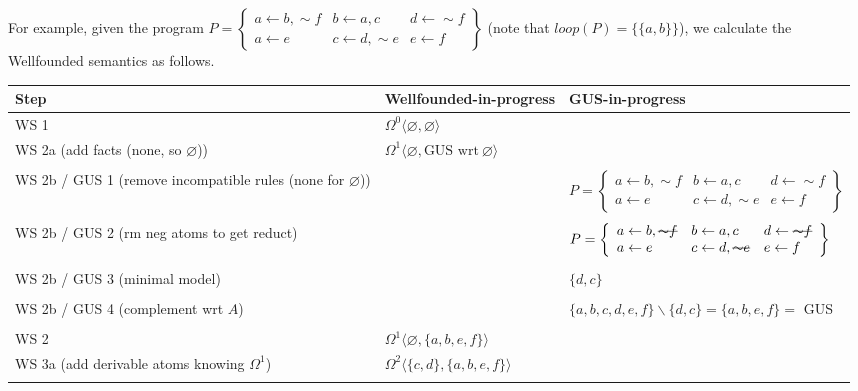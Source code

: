 \documentclass[9pt,a4paper,landscape]{article}
\newcommand{\msout}[1]{\text{\sout{$#1$}}}
\begin{document}
{\pagebreak

For example, given the program $P = \left\{\begin{array}{lll}
a \leftarrow b, {\sim} f & b \leftarrow a, c & d \leftarrow {\sim} f\\
a \leftarrow e & c \leftarrow d, {\sim} e & e \leftarrow f
\end{array}\right\}$ (note that $loop(P) = \{ \{a, b \} \}$), we calculate the Wellfounded semantics as follows.

\begin{center}
	\begin{tabular}{p{5cm}p{5cm}p{7cm}}
		Step & Wellfounded-in-progress & GUS-in-progress\\ \midrule
		WS 1
		& $\Omega^0 \langle \varnothing, \varnothing \rangle$ &\\ \midrule
		WS 2a (add facts (none, so $\varnothing$))
		& $\Omega^1 \langle \varnothing, \text{GUS wrt}\ \varnothing \rangle$ &\\&\\
		WS 2b / GUS 1 (remove incompatible rules (none for $\varnothing$)) 
		&
		& $P = \left\{\begin{array}{lll}
		a \leftarrow b, {\sim} f & b \leftarrow a, c & d \leftarrow {\sim} f\\
		a \leftarrow e & c \leftarrow d, {\sim} e & e \leftarrow f
		\end{array}\right\}$ \\ &\\
		WS 2b / GUS 2 (rm neg atoms to get reduct) 
		& 
		& $P = \left\{\begin{array}{lll}
		a \leftarrow b, \msout{{\sim} f} & b \leftarrow a, c & d \leftarrow \msout{{\sim} f}\\
		a \leftarrow e & c \leftarrow d, \msout{{\sim} e} & e \leftarrow f
		\end{array}\right\}$  \\ &\\
		WS 2b / GUS 3 (minimal model) 
		& 
		& $\{ d, c \}$ \\ &\\
		WS 2b / GUS 4 (complement wrt $A$) 
		&
		&  $\{a, b, c, d, e, f\} \backslash \{d, c\} = \{a, b, e, f\} = $ GUS  \\&\\
		WS 2
		& $\Omega^1 \langle \varnothing, \{a, b, e, f\} \rangle$ &\\ \midrule
		WS 3a (add derivable atoms knowing $\Omega^1$) 
		& $\Omega^2 \langle \{c, d\}, \{a, b, e, f\} \rangle$ &\\&\\

\end{tabular}
\end{center}}
\end{document}
